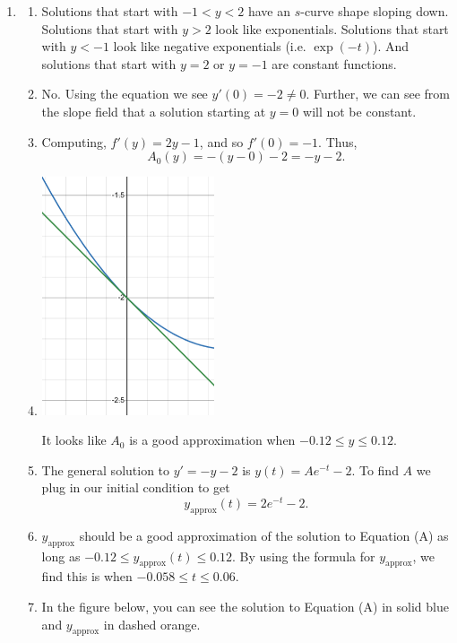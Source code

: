 \begin{enumerate}
	\item \begin{enumerate}
		      \item Solutions that start with $-1<y<2$ have an $s$-curve shape sloping down. Solutions
		            that start with $y>2$ look like exponentials. Solutions that start with $y< -1$ look like
		            negative exponentials (i.e. $\exp(-t)$). And solutions that start with $y=2$ or $y=-1$ are
		            constant functions.
		      \item No. Using the equation we see $y'(0)=-2\neq 0$. Further, we can see from the slope
		            field that a solution starting at $y=0$  will not be constant.
		      \item Computing, $f'(y) = 2y-1$, and so $f'(0)=-1$. Thus,
		            \[
			            A_0(y) = -(y-0) -2=-y-2.
		            \]
		      \item \phantom{.}

		            \includegraphics[width=2in]{./resources/tutorial-07-1d.png}

		            It looks like $A_0$ is a good approximation when $-0.12\leq y\leq 0.12$.

		      \item The general solution to $y'=-y-2$ is $y(t)=Ae^{-t}-2$. To find $A$ we plug in our initial
		            condition to get
		            \[
			            y_{\text{approx}}(t)=2e^{-t}-2.
		            \]

		      \item $y_{\text{approx}}$ should be a good approximation of the solution to Equation (A) as long as
		            $-0.12 \leq y_{\text{approx}}(t)\leq 0.12$. By using the formula for $y_{\text{approx}}$,
		            we find this is when $-0.058\leq t \leq 0.06$.
		      \item In the figure below, you can see the solution to Equation (A) in solid blue and $y_{\text{approx}}$ in dashed orange.


\end{enumerate}
\end{enumerate}
